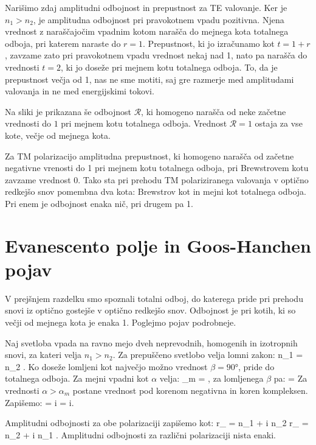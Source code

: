 Narišimo zdaj amplitudni odbojnost in prepustnost za TE valovanje. Ker je 
$n_1>n_2$, je amplitudna odbojnost pri pravokotnem vpadu pozitivna. Njena
vrednost z naraščajočim vpadnim kotom narašča do mejnega kota totalnega
odboja, pri katerem naraste do $r=1$. Prepustnost, ki jo izračunamo
kot $t = 1+r$, zavzame zato pri pravokotnem vpadu vrednost nekaj nad 1,
nato pa narašča do vrednosti $t=2$, ki jo doseže pri mejnem kotu totalnega
odboja. To, da je prepustnost večja od 1, nas ne sme motiti, saj gre
razmerje med amplitudami valovanja in ne med energijskimi tokovi.

Na sliki je prikazana še odbojnost $\mathcal{R}$, ki homogeno
narašča od neke začetne vrednosti do $1$ pri mejnem kotu totalnega 
odboja. Vrednost $\mathcal{R} = 1$ ostaja za vse kote, večje
od mejnega kota. 

Za TM polarizacijo amplitudna prepustnost, ki homogeno
narašča od začetne negativne vrenosti do 1 pri mejnem
kotu totalnega odboja, pri Brewstrovem kotu zavzame vrednost 0. 
Tako sta pri prehodu TM polariziranega valovanja v optično redkejšo
snov pomembna dva kota: Brewstrov kot in mejni kot totalnega odboja.
Pri enem je odbojnost enaka nič, pri drugem pa 1. 

\section{Evanescento polje in Goos-Hanchen pojav}
V prejšnjem razdelku smo spoznali totalni odboj, do katerega
pride pri prehodu snovi iz optično gostejše v optično redkejšo 
snov. Odbojnost je pri kotih, ki so večji od mejnega kota
je enaka 1. Poglejmo pojav podrobneje.

Naj svetloba vpada na ravno mejo dveh neprevodnih, homogenih 
in izotropnih snovi, za kateri velja $n_1>n_2$.
Za prepuščeno svetlobo velja lomni zakon:
\beq
n_1 \sin \alpha = n_2 \sin \beta.
\eeq
Ko doseže lomljeni kot največjo možno vrednost $\beta = 90\si{\degree}$,
pride do totalnega odboja. Za mejni vpadni kot $\alpha$ velja:
\beq
\sin \alpha_m = ,
\eeq
za lomljenega $\beta$ pa:
\beq
\cos \beta  = 
\eeq
Za vrednosti $\alpha > \alpha_m$ postane vrednost pod korenom
negativna in koren kompleksen. Zapišemo:
\beq
\cos \beta = i  = i\kappa.
\eeq

Amplitudni odbojnosti za obe polarizaciji zapišemo kot:
\beq
r_{} = 
{n_1 \cos \alpha + i n_2 \kappa} \qquad {} \qquad
r_{} = 
{n_2 \cos \alpha + i n_1 \kappa}.
\eeq
Amplitudni odbojnosti za različni polarizaciji nista enaki.

